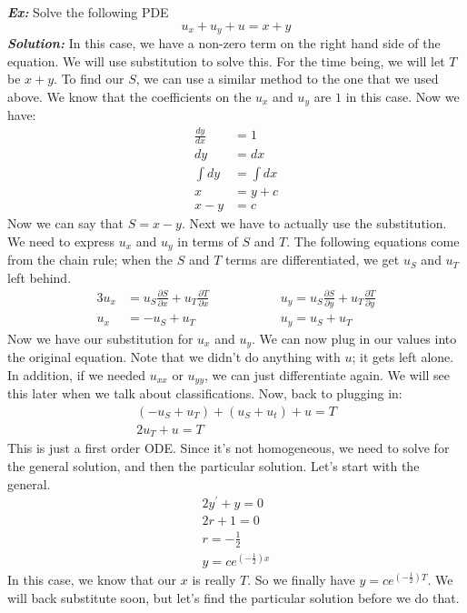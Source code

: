 \documentclass{article}
\begin{document}
\newpage
\noindent\textbf{\textit{Ex:}} Solve the following PDE
\[
u_{x} + u_{y} + u = x + y
\]
\indent \textbf{\textit{Solution:}} In this case, we have a non-zero term on the right hand side of the equation. We will use substitution to solve this. For the time being, we will let $T$ be $x + y$. To find our $S$, we can use a similar method to the one that we used above. We know that the coefficients on the $u_{x}$ and $u_{y}$ are $1$ in this case. Now we have:
\begin{align*}
\frac{dy}{dx} &= 1\\
dy &= dx\\
\int dy &= \int dx\\
x &= y + c\\
x - y &= c
\end{align*}
\noindent Now we can say that $S = x - y$. Next we have to actually use the substitution. We need to express $u_{x}$ and $u_{y}$ in terms of $S$ and $T$. The following equations come from the chain rule; when the $S$ and $T$ terms are differentiated, we get $u_{S}$ and $u_{T}$ left behind.
\begin{alignat*}{3}
u_{x} &= u_{S}\frac{\partial S}{\partial x} + u_{T}\frac{\partial T}{\partial x} 
\qquad\qquad &&u_{y} = u_{S}\frac{\partial S}{\partial y} + u_{T}\frac{\partial T}{\partial y}\\
u_{x} &= -u_{S} + u_{T}  \qquad\qquad &&u_{y} = u_{S} + u_{T}
\end{alignat*}
\noindent Now we have our substitution for $u_{x}$ and $u_{y}$. We can now plug in our values into the original equation. Note that we didn't do anything with $u$; it gets left alone. In addition, if we needed $u_{xx}$ or $u_{yy}$, we can just differentiate again. We will see this later when we talk about classifications. Now, back to plugging in:
\begin{gather*}
(-u_{S} + u_{T}) + (u_{S} + u_{t}) + u = T\\
2u_{T} + u = T
\end{gather*}
\noindent This is just a first order ODE. Since it's not homogeneous, we need to solve for the general solution, and then the particular solution. Let's start with the general.
\begin{gather*}
2y^{'} + y = 0\\
2r + 1 = 0\\
r = -\frac{1}{2}\\
y = ce^{\left(-\frac{1}{2}\right)x}
\end{gather*}
\noindent In this case, we know that our $x$ is really $T$. So we finally have $y = ce^{\left(-\frac{1}{2}\right)T}$. We will back substitute soon, but let's find the particular solution before we do that.
\end{document}
